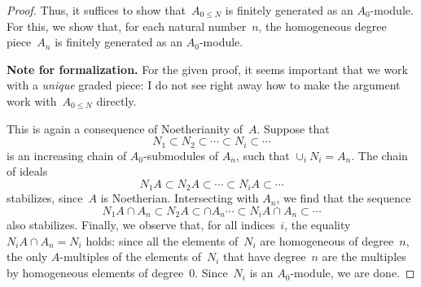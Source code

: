 \documentclass{amsart}
\newcommand{\An}{A_{0\leq N}}
\newcommand{\form}[1]{\medskip
\parbox{330pt}
{\small{{\textbf{Note for formalization.}}
#1}}
\medskip}
\begin{document}
\begin{proof}
Thus, it suffices to show that~$\An$ is finitely generated as an $A_0$-module.  For this, we show that, for each natural number~$n$, the homogeneous degree piece~$A_n$ is finitely generated as an $A_0$-module.

\form{For the given proof, it seems important that we work with a {\emph{unique}} graded piece: I do not see right away how to make the argument work with~$\An$ directly. }

This is again a consequence of Noetherianity of~$A$.  Suppose that
\[
N_1 \subset N_2 \subset \cdots \subset N_i \subset \cdots
\]
is an increasing chain of $A_0$-submodules of $A_n$, such that $\cup_i N_i = A_n$.  The chain of ideals
\[
N_1 A \subset N_2 A \subset \cdots \subset N_i A \subset \cdots
\]
stabilizes, since~$A$ is Noetherian.  Intersecting with $A_n$, we find that the sequence
\[
N_1 A \cap A_n \subset N_2 A \subset \cap A_n \cdots \subset N_i A \cap A_n \subset \cdots
\]
also stabilizes.  Finally, we observe that, for all indices~$i$, the equality $N_i A \cap A_n = N_i$ holds: since all the elements of~$N_i$ are homogeneous of degree~$n$, the only $A$-multiples of the elements of~$N_i$ that have degree~$n$ are the multiples by homogeneous elements of degree~$0$.  Since~$N_i$ is an $A_0$-module, we are done.
\end{proof}
\end{document}
